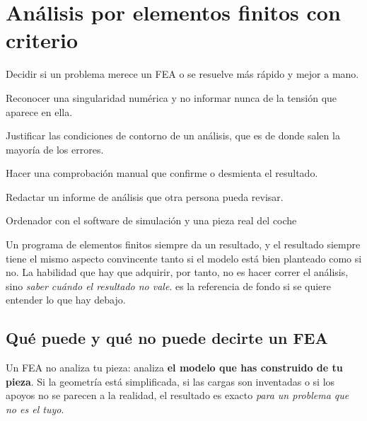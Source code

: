 \chapter{Análisis por elementos finitos con criterio}
\label{ch:elementos_finitos}

\begin{objetivos}
  \item Decidir si un problema merece un FEA o se resuelve más rápido y mejor a
        mano.
  \item Reconocer una singularidad numérica y no informar nunca de la tensión que
        aparece en ella.
  \item Justificar las condiciones de contorno de un análisis, que es de donde
        salen la mayoría de los errores.
  \item Hacer una comprobación manual que confirme o desmienta el resultado.
  \item Redactar un informe de análisis que otra persona pueda revisar.
\end{objetivos}

%
{Ordenador con el software de simulación y una pieza real del coche}

Un programa de elementos finitos siempre da un resultado, y el resultado siempre
tiene el mismo aspecto convincente tanto si el modelo está bien planteado como si
no. La habilidad que hay que adquirir, por tanto, no es hacer correr el análisis,
sino \emph{saber cuándo el resultado no vale}. \textcite{cook_fea_2001} es la
referencia de fondo si se quiere entender lo que hay debajo.

\section{Qué puede y qué no puede decirte un FEA}
\label{sec:elementos_finitos:01}

\begin{clave}
Un FEA no analiza tu pieza: analiza \textbf{el modelo que has construido de tu
pieza}. Si la geometría está simplificada, si las cargas son inventadas o si los
apoyos no se parecen a la realidad, el resultado es exacto \emph{para un problema
que no es el tuyo}.
\end{clave}

